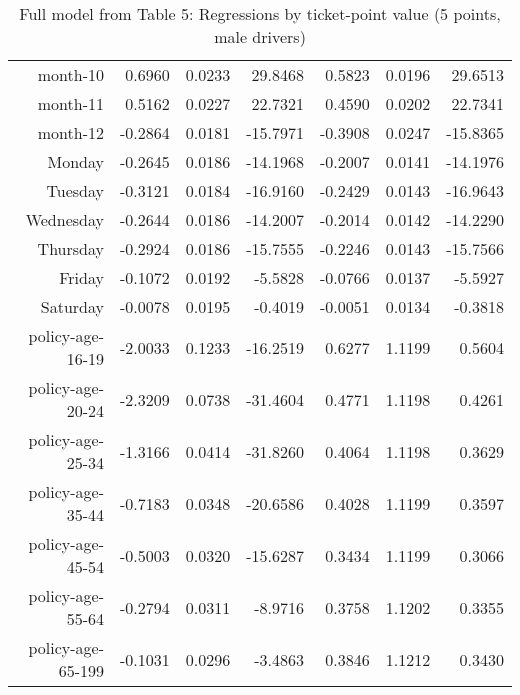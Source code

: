 \documentclass[10pt]{article}
\begin{document}
\begin{table}[ht]
\begin{tabular}{rrrrrrr}
  month-10 & 0.6960 & 0.0233 & 29.8468 & 0.5823 & 0.0196 & 29.6513 \\ 
  month-11 & 0.5162 & 0.0227 & 22.7321 & 0.4590 & 0.0202 & 22.7341 \\ 
  month-12 & -0.2864 & 0.0181 & -15.7971 & -0.3908 & 0.0247 & -15.8365 \\ 
  Monday & -0.2645 & 0.0186 & -14.1968 & -0.2007 & 0.0141 & -14.1976 \\ 
  Tuesday & -0.3121 & 0.0184 & -16.9160 & -0.2429 & 0.0143 & -16.9643 \\ 
  Wednesday & -0.2644 & 0.0186 & -14.2007 & -0.2014 & 0.0142 & -14.2290 \\ 
  Thursday & -0.2924 & 0.0186 & -15.7555 & -0.2246 & 0.0143 & -15.7566 \\ 
  Friday & -0.1072 & 0.0192 & -5.5828 & -0.0766 & 0.0137 & -5.5927 \\ 
  Saturday & -0.0078 & 0.0195 & -0.4019 & -0.0051 & 0.0134 & -0.3818 \\ 
  policy-age-16-19 & -2.0033 & 0.1233 & -16.2519 & 0.6277 & 1.1199 & 0.5604 \\ 
  policy-age-20-24 & -2.3209 & 0.0738 & -31.4604 & 0.4771 & 1.1198 & 0.4261 \\ 
  policy-age-25-34 & -1.3166 & 0.0414 & -31.8260 & 0.4064 & 1.1198 & 0.3629 \\ 
  policy-age-35-44 & -0.7183 & 0.0348 & -20.6586 & 0.4028 & 1.1199 & 0.3597 \\ 
  policy-age-45-54 & -0.5003 & 0.0320 & -15.6287 & 0.3434 & 1.1199 & 0.3066 \\ 
  policy-age-55-64 & -0.2794 & 0.0311 & -8.9716 & 0.3758 & 1.1202 & 0.3355 \\ 
  policy-age-65-199 & -0.1031 & 0.0296 & -3.4863 & 0.3846 & 1.1212 & 0.3430 \\ 
   \hline
\end{tabular}
\caption{Full model from Table 5: Regressions by ticket-point value (5 points, male drivers)} 
\label{tab_5_5_pts_M}
\end{table}


\clearpage
\pagebreak



\end{document}
